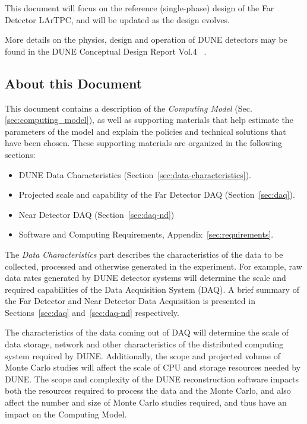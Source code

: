 This document will focus on the reference (single-phase) design of the Far Detector LArTPC, and will be updated
as the design evolves.

More details on the physics, design and operation of DUNE detectors 
may be found in the DUNE Conceptual Design Report Vol.4 ~\cite{cdr_vol4_docdb}. 


\subsection{About this Document}
\label{sec:modelrole}

This document contains a description of the \textit{Computing Model} (Sec.\ref{sec:computing_model}),
as well as supporting materials that help estimate the parameters of the model and
explain the policies and technical solutions that have been chosen.  These supporting materials are
organized in the following sections:

\begin{itemize}
\item DUNE Data Characteristics (Section~\ref{sec:data-characteristics}).
\item Projected scale and capability of the Far Detector DAQ (Section~\ref{sec:daq}).
\item Near Detector DAQ (Section~\ref{sec:daq-nd})
\item Software and Computing Requirements, Appendix~\ref{sec:requirements}.
\end{itemize}

\noindent
The \textit{Data Characteristics} part describes the characteristics of the data to be collected, processed and otherwise generated in the experiment.
For example, raw data rates generated by DUNE detector systems will determine the scale and required capabilities of the Data
Acquisition System (DAQ).  A brief summary of the Far Detector and Near Detector Data Acquisition is presented in Sections~\ref{sec:daq}
and~\ref{sec:daq-nd} respectively.

The characteristics of the data coming out of DAQ will determine the scale of data storage, network
and other characteristics of the distributed computing system required by DUNE.  Additionally, the scope and projected
volume of Monte Carlo studies  will affect the scale of CPU and storage resources needed by DUNE.  The scope and complexity of the DUNE
reconstruction software impacts both the resources required to process the data and the Monte Carlo, and also affect the
number and size of Monte Carlo studies required, and thus have an impact on the Computing Model.

